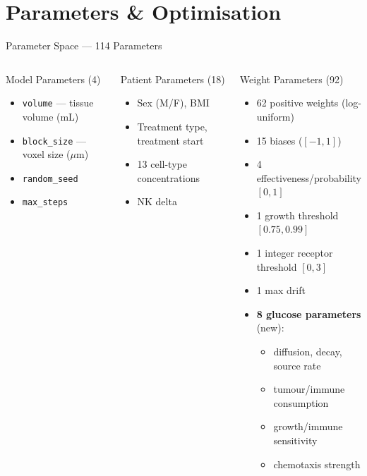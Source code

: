 \documentclass[aspectratio=169,10pt]{beamer}
\begin{document}
\section{Parameters \& Optimisation}

\begin{frame}{Parameter Space --- 114 Parameters}
  \begin{columns}[T]
    \begin{block}{Model Parameters (4)}
      \begin{itemize}
        \item \texttt{volume} --- tissue volume (mL)
        \item \texttt{block\_size} --- voxel size ($\mu$m)
        \item \texttt{random\_seed}
        \item \texttt{max\_steps}
      \end{itemize}
    \end{block}

    \begin{block}{Patient Parameters (18)}
      \begin{itemize}
        \item Sex (M/F), BMI
        \item Treatment type, treatment start
        \item 13 cell-type concentrations
        \item NK delta
      \end{itemize}
    \end{block}

    \begin{block}{Weight Parameters (92)}
      \begin{itemize}
        \item 62 positive weights (log-uniform)
        \item 15 biases ($[-1, 1]$)
        \item 4 effectiveness/probability $[0, 1]$
        \item 1 growth threshold $[0.75, 0.99]$
        \item 1 integer receptor threshold $[0, 3]$
        \item 1 max drift
        \item \textbf{8 glucose parameters} (new):
          \begin{itemize}\scriptsize
            \item diffusion, decay, source rate
            \item tumour/immune consumption
            \item growth/immune sensitivity
            \item chemotaxis strength
          \end{itemize}
      \end{itemize}
    \end{block}
  \end{columns}
\end{frame}
\end{document}
